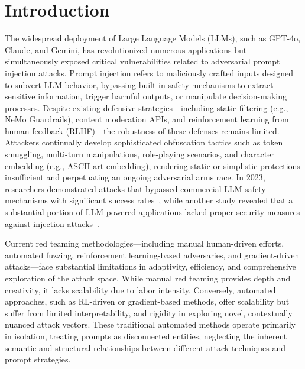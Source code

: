 \section{Introduction}

The widespread deployment of Large Language Models (LLMs), such as GPT-4o, Claude, and Gemini, has revolutionized numerous applications but simultaneously exposed critical vulnerabilities related to adversarial prompt injection attacks. Prompt injection refers to maliciously crafted inputs designed to subvert LLM behavior, bypassing built-in safety mechanisms to extract sensitive information, trigger harmful outputs, or manipulate decision-making processes. Despite existing defensive strategies—including static filtering (e.g., NeMo Guardrails\cite{nvidia2023nemo}), content moderation APIs, and reinforcement learning from human feedback (RLHF)—the robustness of these defenses remains limited. Attackers continually develop sophisticated obfuscation tactics such as token smuggling, multi-turn manipulations, role-playing scenarios, and character embedding (e.g., ASCII-art embedding), rendering static or simplistic protections insufficient and perpetuating an ongoing adversarial arms race. In 2023, researchers demonstrated attacks that bypassed commercial LLM safety mechanisms with significant success rates~\cite{liu2023autodan}, while another study revealed that a substantial portion of LLM-powered applications lacked proper security measures against injection attacks~\cite{greshake2023youve}.

Current red teaming methodologies—including manual human-driven efforts, automated fuzzing\cite{yu2024llmfuzzer}, reinforcement learning-based adversaries, and gradient-driven attacks—face substantial limitations in adaptivity, efficiency, and comprehensive exploration of the attack space. While manual red teaming provides depth and creativity, it lacks scalability due to labor intensity. Conversely, automated approaches, such as RL-driven or gradient-based methods, offer scalability but suffer from limited interpretability, and rigidity in exploring novel, contextually nuanced attack vectors. These traditional automated methods operate primarily in isolation, treating prompts as disconnected entities, neglecting the inherent semantic and structural relationships between different attack techniques and prompt strategies.

